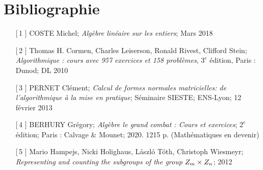\documentclass[12pt]{article}
\begin{document}
\section{Bibliographie}
\begin{enumerate}

	\item[[\,1\!\!]] COSTE Michel; \textit{Algèbre linéaire sur les entiers}; Mars 2018
	\item[[\,2\!\!]] Thomas H. Cormen, Charles Leiserson, Ronald Rivest, Clifford Stein;\\
	      \textit{Algorithmique : cours avec 957 exercices et 158 problèmes}, $3^e$ édition, Paris : Dunod; DL 2010
	\item[[\,3\!\!]] PERNET Clément; \textit{Calcul de formes normales matricielles: de
		      l'algorithmique à la mise en pratique}; Séminaire SIESTE; ENS-Lyon; 12 février 2013
	\item[[\,4\!\!]] BERHURY Grégory; \textit{Algèbre le grand combat : Cours et exercices};
	      $2^e$ édition;
	      Paris : Calvage \& Mounet; 2020. 1215 p. (Mathématiques en devenir)
	\item[[\,5\!\!]] Mario Hampejs, Nicki Holighaus, László Tóth, Christoph Wiesmeyr;\\
	      \textit{Representing and counting the subgroups of the group $Z_m \times Z_n$}; 2012
\end{enumerate}
\end{document}
